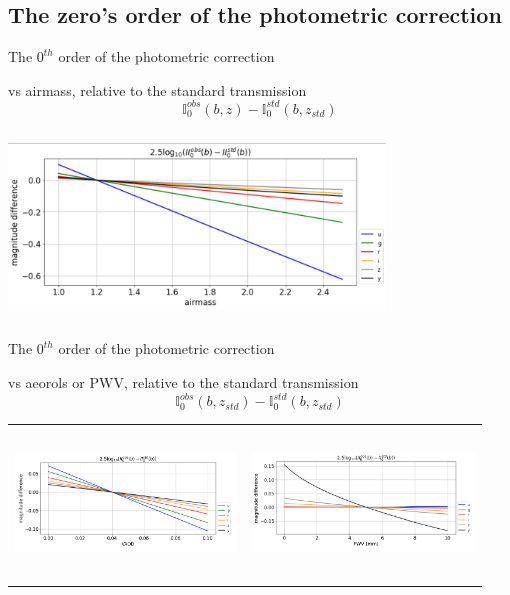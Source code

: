 \documentclass{beamer}
\begin{document}
\subsection{The zero's order of the photometric correction}
\begin{frame}{The $0^{th}$ order of the photometric correction}
\begin{alertblock}{vs airmass, relative to the standard transmission}
\begin{equation}
\mathbb{I}^{obs}_{0}(b,z) - \mathbb{I}^{std}_{0}(b,z_{std})
\end{equation}
\end{alertblock}
\includegraphics[width=10cm, height=5cm]{figs/Integrals_II/Integrals_II0_vs_airmass.png}
\end{frame}


\begin{frame}{The $0^{th}$ order of the photometric correction}
\begin{alertblock}{vs aeorols or PWV, relative to the standard transmission}
\begin{equation}
\mathbb{I}^{obs}_{0}(b,z_{std}) - \mathbb{I}^{std}_{0}(b,z_{std})
\end{equation}
\end{alertblock}
\begin{tabular}{cc}
\includegraphics[width=5.9cm, height=4cm]{figs/Integrals_II/Integrals_II0_vs_VAOD.png} & \includegraphics[width=5.9cm, height=4cm]{figs/Integrals_II/Integrals_II0_vs_PWV.png}
\end{tabular}
\end{frame}
\end{document}

